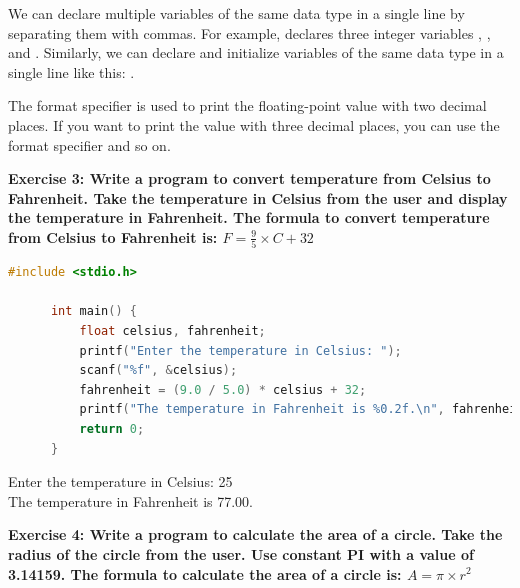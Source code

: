 \documentclass[12pt, openany]{book}
\begin{document}
  \begin{infobox}
      We can declare multiple variables of the same data type in a single line by separating them with commas. For example,  declares three integer variables , , and . Similarly, we can declare and initialize variables of the same data type in a single line like this: .
  \end{infobox}
  \begin{infobox}
      The  format specifier is used to print the floating-point value with two decimal places. If you want to print the value with three decimal places, you can use the  format specifier and so on.
  \end{infobox}
  
  \clearpage
  \noindent\textbf{Exercise 3: Write a program to convert temperature from Celsius to Fahrenheit. Take the temperature in Celsius from the user and display the temperature in Fahrenheit. The formula to convert temperature from Celsius to Fahrenheit is: $F = \frac{9}{5} \times C + 32$}
  
  \begin{lstlisting}[language=C, caption=Solution to Exercise 3]
      #include <stdio.h>
      
      int main() {
          float celsius, fahrenheit;
          printf("Enter the temperature in Celsius: ");
          scanf("%f", &celsius);
          fahrenheit = (9.0 / 5.0) * celsius + 32;
          printf("The temperature in Fahrenheit is %0.2f.\n", fahrenheit);
          return 0;
      }
  \end{lstlisting}
  \begin{tcolorbox}[colback=lightgray!10, colframe=black, title=Output]
      Enter the temperature in Celsius: 25 \\
      The temperature in Fahrenheit is 77.00.
  \end{tcolorbox}
  \vspace{10pt}
  \noindent\textbf{Exercise 4: Write a program to calculate the area of a circle. Take the radius of the circle from the user. Use constant PI with a value of 3.14159. The formula to calculate the area of a circle is: $A = \pi \times r^2$}
  
\end{document}
